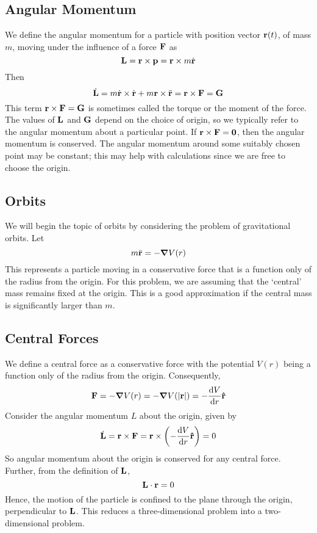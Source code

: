 \subsection{Angular Momentum}
We define the angular momentum for a particle with position vector \(\vb r(t)\), of mass \(m\), moving under the influence of a force \(\vb F\) as
\[
	\vb L = \vb r \times \vb p = \vb r \times m \dot{\vb r}
\]
Then
\[
	\dot{\vb L} = m\dot{\vb r} \times \dot{\vb r} + m\vb r \times \ddot{\vb r} = \vb r \times \vb F = \vb G
\]
This term \(\vb r \times \vb F = \vb G\) is sometimes called the torque or the moment of the force.
The values of \(\vb L\) and \(\vb G\) depend on the choice of origin, so we typically refer to the angular momentum about a particular point.
If \(\vb r \times \vb F = \vb 0\), then the angular momentum is conserved.
The angular momentum around some suitably chosen point may be constant; this may help with calculations since we are free to choose the origin.

\subsection{Orbits}
We will begin the topic of orbits by considering the problem of gravitational orbits.
Let
\[
	m\ddot{\vb r} = -\grad V(r)
\]
This represents a particle moving in a conservative force that is a function only of the radius from the origin.
For this problem, we are assuming that the `central' mass remains fixed at the origin.
This is a good approximation if the central mass is significantly larger than \(m\).

\subsection{Central Forces}
We define a central force as a conservative force with the potential \(V(r)\) being a function only of the radius from the origin.
Consequently,
\[
	\vb F = -\grad V(r) = -\grad V(\abs{\vb r}) = -\frac{\dd{V}}{\dd{r}}\vu{r}
\]
Consider the angular momentum \(L\) about the origin, given by
\[
	\dot{\vb L} = \vb r \times \vb F = \vb r \times \left(-\frac{\dd{V}}{\dd{r}}\vu{r}\right) = 0
\]
So angular momentum about the origin is conserved for any central force.
Further, from the definition of \(\vb L\),
\[
	\vb L \cdot \vb r = 0
\]
Hence, the motion of the particle is confined to the plane through the origin, perpendicular to \(\vb L\).
This reduces a three-dimensional problem into a two-dimensional problem.

